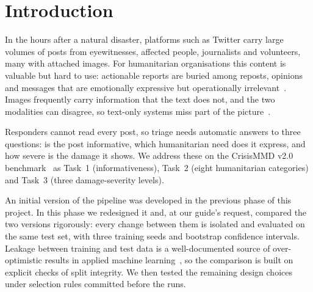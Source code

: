 \documentclass[conference]{IEEEtran}
\begin{document}
\section{Introduction}

In the hours after a natural disaster, platforms such as Twitter carry large volumes of posts from eyewitnesses, affected people, journalists and volunteers, many with attached images. For humanitarian organisations this content is valuable but hard to use: actionable reports are buried among reposts, opinions and messages that are emotionally expressive but operationally irrelevant~\cite{imran2015}. Images frequently carry information that the text does not, and the two modalities can disagree, so text-only systems miss part of the picture~\cite{alam2018,ofli2020}.

Responders cannot read every post, so triage needs automatic answers to three questions: is the post informative, which humanitarian need does it express, and how severe is the damage it shows. We address these on the CrisisMMD v2.0 benchmark~\cite{alam2018} as Task~1 (informativeness), Task~2 (eight humanitarian categories) and Task~3 (three damage-severity levels).

An initial version of the pipeline was developed in the previous phase of this project. In this phase we redesigned it and, at our guide's request, compared the two versions rigorously: every change between them is isolated and evaluated on the same test set, with three training seeds and bootstrap confidence intervals. Leakage between training and test data is a well-documented source of over-optimistic results in applied machine learning~\cite{kapoor2023}, so the comparison is built on explicit checks of split integrity. We then tested the remaining design choices under selection rules committed before the runs.
\end{document}
